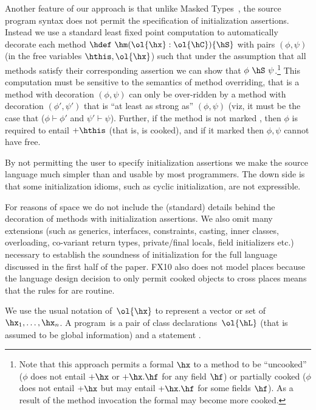 Another feature of our approach is that unlike Masked
Types~\cite{XinQi:2009}, the source program syntax does not permit the
specification of initialization assertions. Instead we use a standard
least fixed point computation to automatically decorate each method
$\hdef~\hm(\ol{\hx}:\ol{\hC})\{\hS\}$ with pairs $(\phi, \psi)$ (in the free
variables $\hthis, \ol{\hx}$) such that under the assumption that all
methods satisfy their corresponding assertion we can show that
$\phi~\hS~\psi$.\footnote{Note that this approach permits a formal $\hx$ to a
  method to be ``uncooked'' ($\phi$ does not entail $+\hx$ or
  $+\hx.\hf$ for any field $\hf$) or partially cooked ($\phi$ does not
  entail $+\hx$ but may entail $+\hx.\hf$ for some fields $\hf$). As a
  result of the method invocation the formal may become more cooked.}
This computation must be sensitive to the semantics
of method overriding, that is a method with decoration $(\phi,\psi)$
can only be over-ridden by a method with decoration $(\phi',\psi')$
that is ``at least as strong as'' $(\phi,\psi)$ (viz, it must be the
case that ($\phi \vdash \phi'$ and $\psi' \vdash \psi$). Further, if
the method is not marked , then $\phi$ is required
to entail $+\hthis$ (that is,  is cooked), and if it marked
 then $\phi,\psi$ cannot have  free.


By not permitting the user to specify initialization assertions we
make the source language much simpler than \cite{XinQi:2009} and
usable by most programmers. The down side is that some initialization
idioms, such as cyclic initialization, are not expressible.

For reasons of space we do not include the (standard) details behind
the decoration of methods with initialization assertions. We also omit
many extensions (such as generics, interfaces, constraints, casting,
inner classes, overloading, co-variant return types, private/final
locals, field initializers etc.) necessary to establish the soundness
of initialization for the full language discussed in the first half of
the paper. FX10 also does not model places because the language design
decision to only permit cooked objects to cross places means that the
rules for  are routine.

We use the usual notation of~$\ol{\hx}$ to represent a vector or set of~$\hx_1, \ldots,\hx_n$.
A program~\hP is a pair of class declarations~$\ol{\hL}$ (that is assumed to be global information)
    and a statement \hS.

